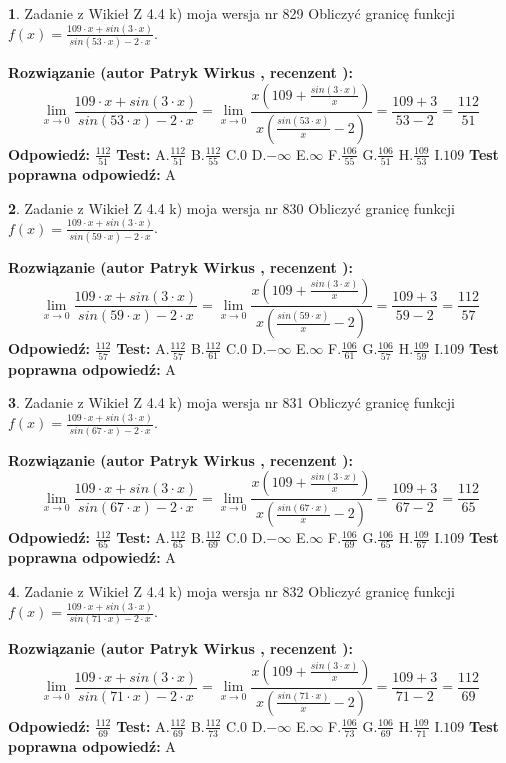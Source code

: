 \documentclass[12pt, a4paper]{article}
\theoremstyle{definition} %
\newtheorem{zad}{}
\newcommand{\zadStart}[1]{\begin{zad}#1\newline}
\newcommand{\zadStop}{\end{zad}}
\newcommand{\rozwStart}[2]{\noindent \textbf{Rozwiązanie (autor #1 , recenzent #2): }\newline}
\newcommand{\rozwStop}{\newline}
\newcommand{\odpStart}{\noindent \textbf{Odpowiedź:}\newline}
\newcommand{\odpStop}{\newline}
\newcommand{\testStart}{\noindent \textbf{Test:}\newline}
\newcommand{\testStop}{\newline}
\newcommand{\kluczStart}{\noindent \textbf{Test poprawna odpowiedź:}\newline}
\newcommand{\kluczStop}{\newline}
\begin{document}
\zadStart{Zadanie z Wikieł Z 4.4 k) moja wersja nr 829}
Obliczyć granicę funkcji $f(x)=\frac{109\cdot x +sin(3\cdot x)}{sin(53\cdot x) -2\cdot x}$.
\zadStop
\rozwStart{Patryk Wirkus}{}
$$\lim\limits_{x\to 0}\frac{109\cdot x +sin(3\cdot x)}{sin(53\cdot x) -2\cdot x}
=\lim\limits_{x\to 0}\frac{x(109+\frac{sin(3\cdot x)}{x})}{x(\frac{sin(53\cdot x)}{x}-2)}
=\frac{109+3}{53-2} = \frac{112}{51}$$
\rozwStop
\odpStart
$\frac{112}{51}$
\odpStop
\testStart
A.$\frac{112}{51}$
B.$\frac{112}{55}$
C.$0$
D.$-\infty$
E.$\infty$
F.$\frac{106}{55}$
G.$\frac{106}{51}$
H.$\frac{109}{53}$
I.$109$
\testStop
\kluczStart
A
\kluczStop



\zadStart{Zadanie z Wikieł Z 4.4 k) moja wersja nr 830}
Obliczyć granicę funkcji $f(x)=\frac{109\cdot x +sin(3\cdot x)}{sin(59\cdot x) -2\cdot x}$.
\zadStop
\rozwStart{Patryk Wirkus}{}
$$\lim\limits_{x\to 0}\frac{109\cdot x +sin(3\cdot x)}{sin(59\cdot x) -2\cdot x}
=\lim\limits_{x\to 0}\frac{x(109+\frac{sin(3\cdot x)}{x})}{x(\frac{sin(59\cdot x)}{x}-2)}
=\frac{109+3}{59-2} = \frac{112}{57}$$
\rozwStop
\odpStart
$\frac{112}{57}$
\odpStop
\testStart
A.$\frac{112}{57}$
B.$\frac{112}{61}$
C.$0$
D.$-\infty$
E.$\infty$
F.$\frac{106}{61}$
G.$\frac{106}{57}$
H.$\frac{109}{59}$
I.$109$
\testStop
\kluczStart
A
\kluczStop



\zadStart{Zadanie z Wikieł Z 4.4 k) moja wersja nr 831}
Obliczyć granicę funkcji $f(x)=\frac{109\cdot x +sin(3\cdot x)}{sin(67\cdot x) -2\cdot x}$.
\zadStop
\rozwStart{Patryk Wirkus}{}
$$\lim\limits_{x\to 0}\frac{109\cdot x +sin(3\cdot x)}{sin(67\cdot x) -2\cdot x}
=\lim\limits_{x\to 0}\frac{x(109+\frac{sin(3\cdot x)}{x})}{x(\frac{sin(67\cdot x)}{x}-2)}
=\frac{109+3}{67-2} = \frac{112}{65}$$
\rozwStop
\odpStart
$\frac{112}{65}$
\odpStop
\testStart
A.$\frac{112}{65}$
B.$\frac{112}{69}$
C.$0$
D.$-\infty$
E.$\infty$
F.$\frac{106}{69}$
G.$\frac{106}{65}$
H.$\frac{109}{67}$
I.$109$
\testStop
\kluczStart
A
\kluczStop



\zadStart{Zadanie z Wikieł Z 4.4 k) moja wersja nr 832}
Obliczyć granicę funkcji $f(x)=\frac{109\cdot x +sin(3\cdot x)}{sin(71\cdot x) -2\cdot x}$.
\zadStop
\rozwStart{Patryk Wirkus}{}
$$\lim\limits_{x\to 0}\frac{109\cdot x +sin(3\cdot x)}{sin(71\cdot x) -2\cdot x}
=\lim\limits_{x\to 0}\frac{x(109+\frac{sin(3\cdot x)}{x})}{x(\frac{sin(71\cdot x)}{x}-2)}
=\frac{109+3}{71-2} = \frac{112}{69}$$
\rozwStop
\odpStart
$\frac{112}{69}$
\odpStop
\testStart
A.$\frac{112}{69}$
B.$\frac{112}{73}$
C.$0$
D.$-\infty$
E.$\infty$
F.$\frac{106}{73}$
G.$\frac{106}{69}$
H.$\frac{109}{71}$
I.$109$
\testStop
\kluczStart
A
\kluczStop
\end{document}
